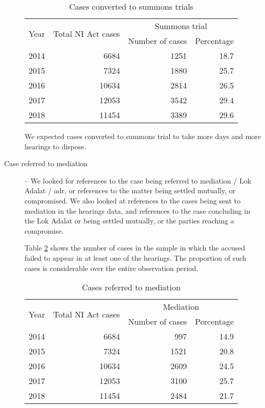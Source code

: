 \begin{description}
\begin{longtable}{@{}lrrr@{}}
 \caption{Cases converted to summons trials}\label{tab:summons_yearWise}\\
 \toprule
 \multirow{2}{*}{Year} & \multirow{2}{*}{Total NI Act cases} & \multicolumn{2}{c}{Summons trial}\\
 \cmidrule{3-4}
 && Number of cases & Percentage \\
 \midrule\endhead
 2014 & 6684 & 1251 & 18.7 \\
 2015 & 7324 & 1880 & 25.7 \\
 2016 & 10634 & 2814 & 26.5 \\
 2017 & 12053 & 3542 & 29.4 \\
 2018 & 11454 & 3389 & 29.6 \\
 \bottomrule
\end{longtable}

We expected cases converted to summons trial to take more days and more hearings to dispose.

\item [Case referred to mediation] -- We looked for references to the case being referred to mediation / Lok Adalat / \gls{adr}, or references to the matter being settled mutually, or compromised. We also looked at references to the cases being sent to mediation in the hearings data, and references to the case concluding in the Lok Adalat or being settled mutually, or the parties reaching a compromise.

Table \ref{tab:mediation_yearWise} shows the number of cases in the sample in which the accused failed to appear in at least one of the hearings. The proportion of such cases is considerable over the entire observation period.

\begin{longtable}{@{}lrrr@{}}
 \caption{Cases referred to mediation}\label{tab:mediation_yearWise}\\
 \toprule
 \multirow{2}{*}{Year} & \multirow{2}{*}{Total NI Act cases} & \multicolumn{2}{c}{Mediation}\\
 \cmidrule{3-4}
 && Number of cases & Percentage \\
 \midrule\endhead
 2014 & 6684 & 997 & 14.9 \\
 2015 & 7324 & 1521 & 20.8 \\
 2016 & 10634 & 2609 & 24.5 \\
 2017 & 12053 & 3100 & 25.7 \\
 2018 & 11454 & 2484 & 21.7 \\
 \bottomrule
\end{longtable}


\end{description}
